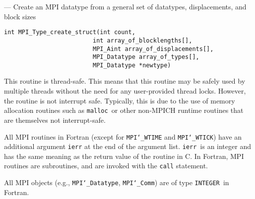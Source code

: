 \startmanpage
{}
--- Create an MPI datatype from a general set of  datatypes, displacements, and block sizes 
\startvb\begin{verbatim}
int MPI_Type_create_struct(int count,
                         int array_of_blocklengths[],
                         MPI_Aint array_of_displacements[],
                         MPI_Datatype array_of_types[],
                         MPI_Datatype *newtype)

\end{verbatim}
\endvb

\par
{}
\par
{}
\par
This routine is thread-safe.  This means that this routine may be
safely used by multiple threads without the need for any user-provided
thread locks.  However, the routine is not interrupt safe.  Typically,
this is due to the use of memory allocation routines such as {\tt malloc
}or other non-MPICH runtime routines that are themselves not interrupt-safe.
\par
{}
All MPI routines in Fortran (except for {\tt MPI{\tt \char`\_}WTIME} and {\tt MPI{\tt \char`\_}WTICK}) have
an additional argument {\tt ierr} at the end of the argument list.  {\tt ierr
}is an integer and has the same meaning as the return value of the routine
in C.  In Fortran, MPI routines are subroutines, and are invoked with the
{\tt call} statement.
\par
All MPI objects (e.g., {\tt MPI{\tt \char`\_}Datatype}, {\tt MPI{\tt \char`\_}Comm}) are of type {\tt INTEGER
}in Fortran.
\par
